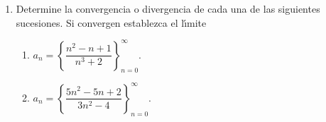 \begin{enumerate}
\begin{enumerate}
\item $g\left(  x\right)  =\dfrac{x^{2}-2x-8}{x-4}.$

\item $f\left(  t\right)  =\dfrac{7t^{3}+4t}{2t^{3}-t^{2}+3}.$

\item $h\left(  x\right)  =\dfrac{1}{\left\vert x\right\vert +1}-\dfrac{x^{2}%
}{2}.$

\item $f\left(  x\right)  =\dfrac{x+2}{\cos x}.$

\item $h\left(  x\right)  =\dfrac{x^{2}+3x-10}{x-2}.$

\item $f\left(  x\right)  =\dfrac{\left\vert x\right\vert }{x^{2}}.$

\item $g\left(  x\right)  =e^{-\tfrac{1}{x^{2}}}.$

\item $g\left(  x\right)  =\left\{
\begin{tabular}
[c]{ccc}%
$$ & , si & $x>0$\\
$1$ & , si & $x=0$\\
$$ & , si & $x<0.$%
\end{tabular}
\ \ \ \right.  $

\item $h\left(  z\right)  =\dfrac{\sqrt{7+z}-3}{z^{2}-4}.$

\item $f\left(  x\right)  =\left\{
\begin{tabular}
[c]{ccc}%
$1-x$ & , si & $x$\\
$x^{3}-2x$ & , si & $x>2.$%
\end{tabular}
\ \ \ \right.  $

\item $g\left(  x\right)  =\dfrac{1-\cos x}{x^{2}}.$
\end{enumerate}

\item Determine la convergencia o divergencia de cada una de las siguientes
sucesiones. Si convergen establezca el l\'{\i}mite

\begin{enumerate}
\item $a_{n}=\left\{  \dfrac{n^{2}-n+1}{n^{3}+2}\right\}  _{n=0}^{\infty}.$

\item $a_{n}=\left\{  \dfrac{5n^{2}-5n+2}{3n^{2}-4}\right\}  _{n=0}^{\infty}.$


\end{enumerate}
\end{enumerate}

